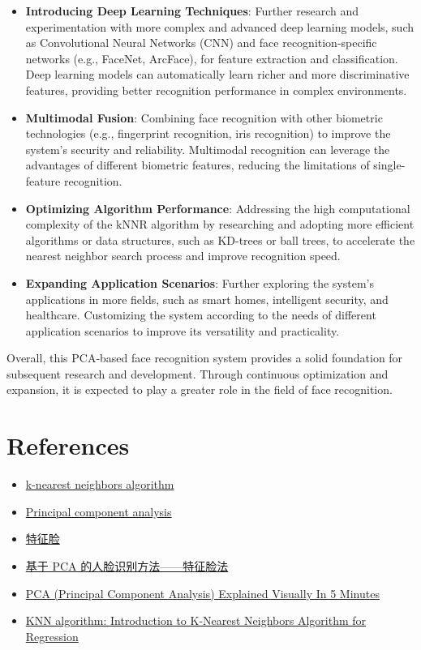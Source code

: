 \documentclass{article}
\begin{document}
\begin{itemize}
    \item \textbf{Introducing Deep Learning Techniques}: Further research and experimentation with more complex and advanced deep learning models, such as Convolutional Neural Networks (CNN) and face recognition-specific networks (e.g., FaceNet, ArcFace), for feature extraction and classification. Deep learning models can automatically learn richer and more discriminative features, providing better recognition performance in complex environments.
    \item \textbf{Multimodal Fusion}: Combining face recognition with other biometric technologies (e.g., fingerprint recognition, iris recognition) to improve the system's security and reliability. Multimodal recognition can leverage the advantages of different biometric features, reducing the limitations of single-feature recognition.
    \item \textbf{Optimizing Algorithm Performance}: Addressing the high computational complexity of the kNNR algorithm by researching and adopting more efficient algorithms or data structures, such as KD-trees or ball trees, to accelerate the nearest neighbor search process and improve recognition speed.
    \item \textbf{Expanding Application Scenarios}: Further exploring the system's applications in more fields, such as smart homes, intelligent security, and healthcare. Customizing the system according to the needs of different application scenarios to improve its versatility and practicality.
\end{itemize}

Overall, this PCA-based face recognition system provides a solid foundation for subsequent research and development. Through continuous optimization and expansion, it is expected to play a greater role in the field of face recognition.

\section*{References}
\begin{itemize}
    \item \href{https://en.wikipedia.org/wiki/K-nearest_neighbors_algorithm}{k-nearest neighbors algorithm}
    \item \href{https://en.wikipedia.org/wiki/Principal_component_analysis}{Principal component analysis}
    \item \href{https://zh.wikipedia.org/wiki/%E7%89%B9%E5%BE%81%E8%84%B8}{特征脸}
    \item \href{https://zhuanlan.zhihu.com/p/356640804}{基于 PCA 的人脸识别方法——特征脸法}
    \item \href{https://medium.com/towards-data-science/pca-principal-component-analysis-explained-visually-in-5-minutes-20ce8a9ebf0f}{PCA (Principal Component Analysis) Explained Visually In 5 Minutes}
    \item \href{https://www.analyticsvidhya.com/blog/2018/08/k-nearest-neighbor-introduction-regression-python}{KNN algorithm: Introduction to K-Nearest Neighbors Algorithm for Regression}
\end{itemize}
\end{document}

